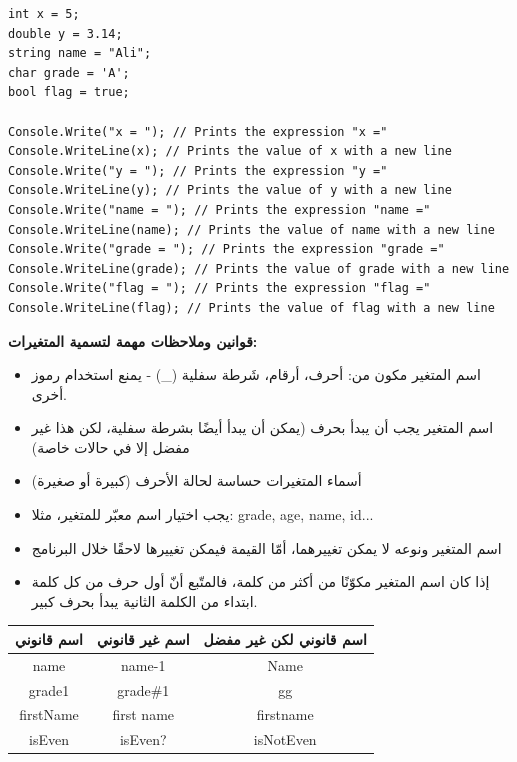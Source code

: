 \documentclass[14pt]{extarticle}
\begin{document}
\begin{boxExample}
\begin{english}
\begin{verbatim}
int x = 5;
double y = 3.14;
string name = "Ali";
char grade = 'A';
bool flag = true;

Console.Write("x = "); // Prints the expression "x ="
Console.WriteLine(x); // Prints the value of x with a new line
Console.Write("y = "); // Prints the expression "y ="
Console.WriteLine(y); // Prints the value of y with a new line
Console.Write("name = "); // Prints the expression "name ="
Console.WriteLine(name); // Prints the value of name with a new line
Console.Write("grade = "); // Prints the expression "grade ="
Console.WriteLine(grade); // Prints the value of grade with a new line
Console.Write("flag = "); // Prints the expression "flag ="
Console.WriteLine(flag); // Prints the value of flag with a new line
\end{verbatim}
\end{english}
\end{boxExample}

\textbf{قوانين وملاحظات مهمة لتسمية المتغيرات:}
\begin{itemize}
\item اسم المتغير مكون من: أحرف، أرقام، شَرطة سفلية (\textenglish{\_}) - يمنع استخدام رموز أخرى.
\item اسم المتغير يجب أن يبدأ بحرف (يمكن أن يبدأ أيضًا بشرطة سفلية، لكن هذا غير مفضل إلا في حالات خاصة)
\item أسماء المتغيرات حساسة لحالة الأحرف (كبيرة أو صغيرة)
\item يجب اختيار اسم معبّر للمتغير، مثلا: \textenglish{grade}, \textenglish{age}, \textenglish{name}, \textenglish{id}...
\item اسم المتغير ونوعه لا يمكن تغييرهما، أمّا القيمة فيمكن تغييرها لاحقًا خلال البرنامج
\item إذا كان اسم المتغير مكوّنًا من أكثر من كلمة، فالمتّبع أنّ أول حرف من كل كلمة ابتداء من الكلمة الثانية يبدأ بحرف كبير.
\end{itemize}

\begin{center}
\begin{tabular}{|c|c|c|}
\hline
اسم قانوني & اسم غير قانوني & اسم قانوني لكن غير مفضل \\
\hline
\textenglish{name} & \textenglish{name-1} & \textenglish{Name} \\
\hline
\textenglish{grade1} & \textenglish{grade\#1} & \textenglish{gg} \\
\hline
\textenglish{firstName} & \textenglish{first name} & \textenglish{firstname} \\
\hline
\textenglish{isEven} & \textenglish{isEven?} & \textenglish{isNotEven} \\
\hline
\end{tabular}
\end{center}
\end{document}
